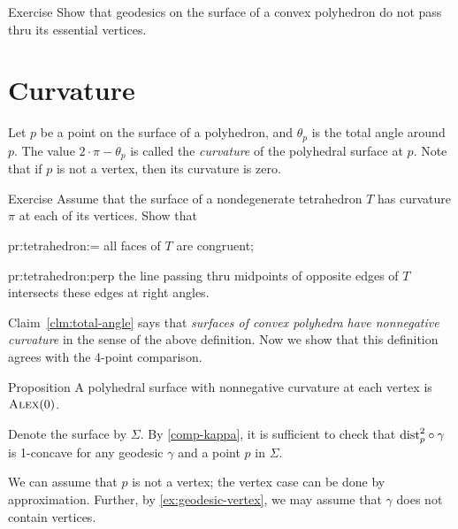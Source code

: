 \begin{thm}{Exercise}\label{ex:geodesic-vertex}
Show that geodesics on the surface of a convex polyhedron do not pass thru its essential vertices.
\end{thm}

\section{Curvature}

Let $p$ be a point on the surface of a polyhedron, and $\theta_p$ is the total angle around $p$.
The value $2\cdot \pi -\theta_p$ is called the \emph{curvature} of the polyhedral surface at $p$.
Note that if $p$ is not a vertex, then its curvature is zero.

\begin{thm}{Exercise}\label{pr:tetrahedron} 
Assume that the surface of a nondegenerate tetrahedron $T$ has curvature $\pi$ at each of its vertices.
Show that 

\begin{subthm}{pr:tetrahedron:=}
all faces of $T$ are congruent; 
\end{subthm}

\begin{subthm}{pr:tetrahedron:perp} the line passing thru midpoints of opposite edges of $T$ intersects these edges at right angles.
\end{subthm}
 
\end{thm}

Claim~\ref{clm:total-angle} says that \textit{surfaces of convex polyhedra have nonnegative curvature} in the sense of the above definition.
Now we show that this definition agrees with the 4-point comparison.

\begin{thm}{Proposition}\label{prop:poly-CBB}
A polyhedral surface with nonnegative curvature at each vertex is $\textsc{Alex}(0)$.
\end{thm}

Denote the surface by $\Sigma$.
By \ref{comp-kappa}, it is sufficient to check that 
$\mathrm{dist}_p^2\circ\gamma$ is 1-concave for any geodesic $\gamma$ and a point $p$ in $\Sigma$.

We can assume that $p$ is not a vertex;
the vertex case can be done by approximation.
Further, by \ref{ex:geodesic-vertex}, we may assume that $\gamma$ does not contain vertices.

